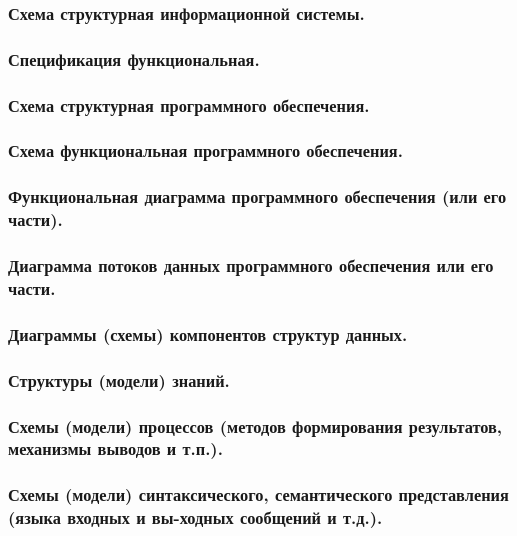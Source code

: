 \documentclass[12pt, left=30mm, right=15mm, top=20mm, bottom=20mm]{templateReportBMSTU}
\begin{document}
	\subsubsection{\textbf{Схема структурная информационной системы.}}

	\subsubsection{\textbf{Спецификация функциональная.}}

	\subsubsection{Схема структурная программного обеспечения.}

	\subsubsection{\textbf{Схема функциональная программного обеспечения.}}

	\subsubsection{\textbf{Функциональная диаграмма программного обеспечения (или его части).}}

	\subsubsection{\textbf{Диаграмма потоков данных программного обеспечения или его части.}}

	\subsubsection{\textbf{Диаграммы (схемы) компонентов структур данных.}}

	\subsubsection{\textbf{Структуры (модели) знаний.}}

	\subsubsection{\textbf{Схемы (модели) процессов (методов формирования результатов, механизмы выводов и т.п.).}}

	\subsubsection{\textbf{Схемы (модели) синтаксического, семантического представления (языка входных и вы-ходных сообщений и т.д.).}}
\end{document}

